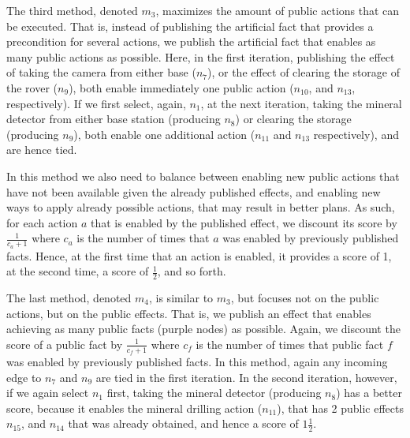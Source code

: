 \documentclass{article}
\newcommand{\mafs}{\textsc {mafs}\xspace}
\newcommand{\dpp}{\textsc {DPP}\xspace}
\theoremstyle{remark}
\begin{document}
The third method, denoted $m_3$, maximizes the amount of public actions that can be executed. That is, instead of publishing the artificial fact that provides a precondition for several actions, we publish the artificial fact that enables as many public actions as possible. Here, in the first iteration, publishing the effect of taking the camera from either base ($n_7$), or the effect of clearing the storage of the rover ($n_9$), both enable immediately one public action ($n_{10}$, and $n_{13}$, respectively). If we first select, again, $n_1$, at the next iteration, taking the mineral detector from either base station (producing $n_8$) or clearing the storage (producing $n_9$), both enable one additional action ($n_{11}$ and $n_{13}$ respectively), and are hence tied. 

In this method we also need to balance between enabling new public actions that have not been available given the already published effects, and enabling new ways to apply already possible actions, that may result in better plans. As such, for each action $a$ that is enabled by the published effect, we discount its score by $\frac{1}{c_a+1}$ where $c_a$ is the number of times that $a$ was enabled by previously published facts. Hence, at the first time that an action is enabled, it provides a score of 1, at the second time, a score of $\frac{1}{2}$, and so forth.

The last method, denoted $m_4$, is similar to $m_3$, but focuses not on the public actions, but on the public effects. That is, we publish an effect that enables achieving as many public facts (purple nodes) as possible. Again, we discount the score of a public fact by $\frac{1}{c_f+1}$ where $c_f$ is the number of times that public fact $f$ was enabled by previously published facts. In this method, again any incoming edge to $n_7$ and $n_9$ are tied in the first iteration. In the second iteration, however, if we again select $n_1$ first, taking the mineral detector (producing $n_8$) has a better score, because it enables the mineral drilling action ($n_{11}$), that has 2 public effects $n_{15}$, and $n_{14}$ that was already obtained, and hence a score of $1\frac{1}{2}$.


\end{document}
